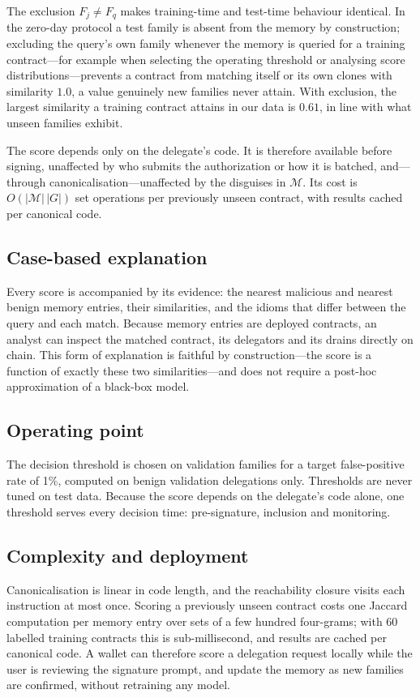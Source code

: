 The exclusion $F_j\ne F_q$ makes training-time and test-time behaviour identical. In the zero-day protocol a test family is absent from the memory by construction; excluding the query's own family whenever the memory is queried for a training contract---for example when selecting the operating threshold or analysing score distributions---prevents a contract from matching itself or its own clones with similarity $1.0$, a value genuinely new families never attain. With exclusion, the largest similarity a training contract attains in our data is $0.61$, in line with what unseen families exhibit.

The score depends only on the delegate's code. It is therefore available before signing, unaffected by who submits the authorization or how it is batched, and---through canonicalisation---unaffected by the disguises in $\mathcal{M}$. Its cost is $O(|\mathcal{M}|\,|G|)$ set operations per previously unseen contract, with results cached per canonical code.

\subsection{Case-based explanation}
Every score is accompanied by its evidence: the nearest malicious and nearest benign memory entries, their similarities, and the idioms that differ between the query and each match. Because memory entries are deployed contracts, an analyst can inspect the matched contract, its delegators and its drains directly on chain. This form of explanation is faithful by construction---the score is a function of exactly these two similarities---and does not require a post-hoc approximation of a black-box model.

\subsection{Operating point}
The decision threshold is chosen on validation families for a target false-positive rate of 1\%, computed on benign validation delegations only. Thresholds are never tuned on test data. Because the score depends on the delegate's code alone, one threshold serves every decision time: pre-signature, inclusion and monitoring.

\subsection{Complexity and deployment}
Canonicalisation is linear in code length, and the reachability closure visits each instruction at most once. Scoring a previously unseen contract costs one Jaccard computation per memory entry over sets of a few hundred four-grams; with $60$ labelled training contracts this is sub-millisecond, and results are cached per canonical code. A wallet can therefore score a delegation request locally while the user is reviewing the signature prompt, and update the memory as new families are confirmed, without retraining any model.
